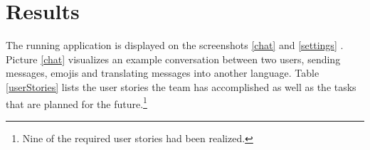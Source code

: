 \section{Results} 

The running application is displayed on the screenshots \ref{chat} and \ref{settings} .
Picture \ref{chat} visualizes an example conversation between two users, sending messages, emojis and translating messages into another language.
Table \ref{userStories} lists the user stories the team has accomplished as well as the tasks that are planned for the future.\footnote{Nine of the required user stories had been realized.}